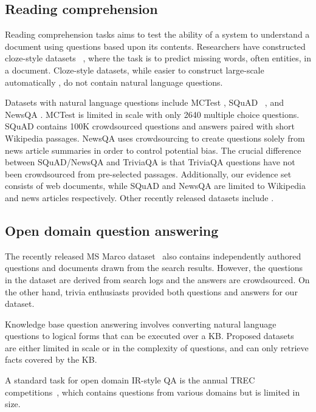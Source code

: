 \subsection{Reading comprehension} Reading comprehension tasks aims to test the ability of a system to understand a document using questions based upon its contents. Researchers have constructed cloze-style datasets ~\cite{Hill:15,Hermann:15,Paperno:16,Onishi:16}, where the task is to predict missing words, often entities, in a document. Cloze-style datasets, while easier to construct large-scale  automatically , do not contain natural language questions. 

Datasets with natural language questions include MCTest \cite{Richardson:13}, SQuAD ~\cite{Rajpurkar:16}, and NewsQA \cite{Trischler:16}. MCTest is limited in scale with only 2640 multiple choice questions. SQuAD contains 100K crowdsourced questions and answers paired with short Wikipedia passages. NewsQA uses crowdsourcing to create questions solely from news article summaries in order to control potential bias. The crucial difference between SQuAD/NewsQA and TriviaQA is that TriviaQA questions have not been crowdsourced from pre-selected passages. Additionally, our evidence set consists of web documents, while SQuAD and NewsQA are limited to Wikipedia  and news articles respectively. Other recently released datasets include \cite{lai2017large}.

\subsection{Open domain question answering}

The recently released MS Marco dataset~\cite{Nguyen:16} also contains independently authored questions and documents drawn from the search results. However, the questions in the dataset are derived from search logs and the answers are crowdsourced. On the other hand, trivia enthusiasts provided both questions and answers for our dataset.

Knowledge base question answering involves converting natural language questions to logical forms that can be executed over a KB. Proposed datasets~\cite{CaiY13,BerantWebQ2013,BordesSimpleQ2015} are either limited in scale or in the complexity of questions, and can only retrieve facts covered by the KB. 

A standard task for open domain IR-style QA is the annual TREC competitions~\cite{Voorhees:00}, which contains questions from various domains but is limited in size. 

